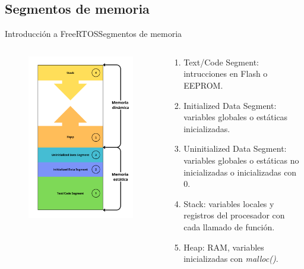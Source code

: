 \documentclass[aspectratio=169, xcolor=dvipsnames]{beamer}
\begin{document}
\subsection{Segmentos de memoria}
\begin{frame}{Introducción a FreeRTOS}{Segmentos de memoria}
\begin{columns}
\begin{column}{0.4\textwidth}
\begin{figure}
\centering
\includegraphics[width=0.7\linewidth]{resources/images/memory_layout.png}
\end{figure}
\end{column}    
\begin{column}{0.6\textwidth}
\begin{enumerate}
    \item Text/Code Segment: intrucciones en Flash o EEPROM.
    \item Initialized Data Segment: variables globales o estáticas inicializadas.
    \item Uninitialized Data Segment: variables globales o estáticas no inicializadas o inicializadas con 0.
    \item Stack: variables locales y registros del procesador con cada llamado de función.
    \item Heap: RAM, variables inicializadas con \textit{malloc()}.
\end{enumerate}
\end{column}
\end{columns}
\end{frame}
\end{document}

